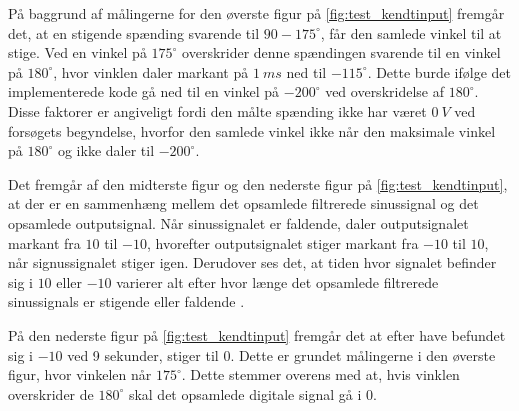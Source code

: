 På baggrund af målingerne for den øverste figur på \autoref{fig:test_kendtinput} fremgår det, at en stigende spænding svarende til $90-175^{\circ}$, får den samlede vinkel til at stige. Ved en vinkel på $175^{\circ}$ overskrider denne spændingen svarende til en vinkel på $180^{\circ}$, hvor vinklen daler markant på $1~ms$ ned til $-115^{\circ}$. 
Dette burde ifølge det implementerede kode gå ned til en vinkel på $-200^{\circ}$ ved overskridelse af $180^{\circ}$.
Disse faktorer er angiveligt fordi den målte spænding ikke har været $0~V$ ved forsøgets begyndelse, hvorfor den samlede vinkel ikke når den maksimale vinkel på $180^{\circ}$ og ikke daler til $-200^{\circ}$.

Det fremgår af den midterste figur og den nederste figur på \autoref{fig:test_kendtinput}, at der er en sammenhæng mellem det opsamlede filtrerede sinussignal og det opsamlede outputsignal. Når sinussignalet er faldende, daler outputsignalet markant fra $10$ til $-10$, hvorefter outputsignalet stiger markant fra $-10$ til $10$, når signussignalet stiger igen. Derudover ses det, at tiden hvor signalet befinder sig i $10$ eller $-10$ varierer alt efter hvor længe det opsamlede filtrerede sinussignals er stigende eller faldende .

På den nederste figur på \autoref{fig:test_kendtinput} fremgår det at efter have befundet sig i $-10$ ved 9 sekunder, stiger til $0$. Dette er grundet målingerne i den øverste figur, hvor vinkelen når $175^{\circ}$. Dette stemmer overens med at, hvis vinklen  overskrider de $180^{\circ}$ skal det opsamlede digitale signal gå i $0$. 
